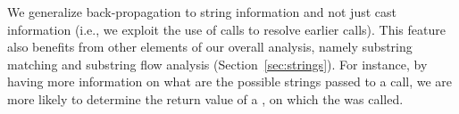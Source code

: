 \begin{compactitem}
  


\item We generalize back-propagation to string information and not
  just cast information (i.e., we exploit the use of
   calls to resolve earlier
   calls). This feature also benefits from other
  elements of our overall analysis, namely substring matching and
  substring flow analysis (Section~\ref{sec:strings}). For instance,
  by having more information on what are the possible strings passed
  to a  call, we are more likely to determine the
  return value of a , on which the  was
  called.
\end{compactitem}



